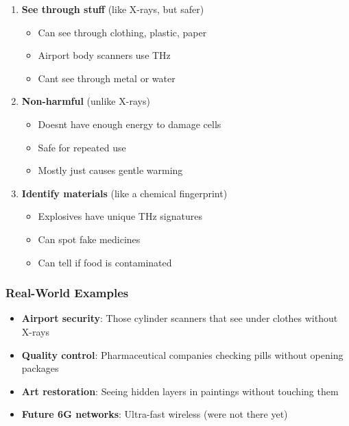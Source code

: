 \begin{enumerate}
\def\labelenumi{\arabic{enumi}.}
\tightlist
\item
  \textbf{See through stuff} (like X-rays, but safer)

  \begin{itemize}
  \tightlist
  \item
    Can see through clothing, plastic, paper
  \item
    Airport body scanners use THz
  \item
    Can\textquotesingle t see through metal or water
  \end{itemize}
\item
  \textbf{Non-harmful} (unlike X-rays)

  \begin{itemize}
  \tightlist
  \item
    Doesn\textquotesingle t have enough energy to damage cells
  \item
    Safe for repeated use
  \item
    Mostly just causes gentle warming
  \end{itemize}
\item
  \textbf{Identify materials} (like a chemical fingerprint)

  \begin{itemize}
  \tightlist
  \item
    Explosives have unique THz signatures
  \item
    Can spot fake medicines
  \item
    Can tell if food is contaminated
  \end{itemize}
\end{enumerate}

\subsubsection{Real-World Examples}\label{real-world-examples}

\begin{itemize}
\tightlist
\item
  \textbf{Airport security}: Those cylinder scanners that see under
  clothes without X-rays
\item
  \textbf{Quality control}: Pharmaceutical companies checking pills
  without opening packages
\item
  \textbf{Art restoration}: Seeing hidden layers in paintings without
  touching them
\item
  \textbf{Future 6G networks}: Ultra-fast wireless
  (we\textquotesingle re not there yet)
\end{itemize}

